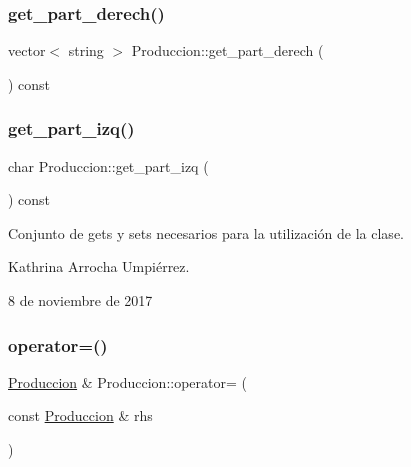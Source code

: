\mbox{\label{class_produccion_a9e1c08ed736e97288f8bf78286498f57}} 
\subsubsection{\texorpdfstring{get\+\_\+part\+\_\+derech()}{get\_part\_derech()}}
{\footnotesize\ttfamily vector$<$ string $>$ Produccion\+::get\+\_\+part\+\_\+derech (\begin{DoxyParamCaption}{ }\end{DoxyParamCaption}) const}

\mbox{\label{class_produccion_ac863aa129550b93bf54b8c6489b432fe}} 
\subsubsection{\texorpdfstring{get\+\_\+part\+\_\+izq()}{get\_part\_izq()}}
{\footnotesize\ttfamily char Produccion\+::get\+\_\+part\+\_\+izq (\begin{DoxyParamCaption}{ }\end{DoxyParamCaption}) const}

Conjunto de gets y sets necesarios para la utilización de la clase.

Kathrina Arrocha Umpiérrez.

8 de noviembre de 2017 \mbox{\label{class_produccion_a31a114a57efbe80598cdfc5b739ed3b4}} 
\subsubsection{\texorpdfstring{operator=()}{operator=()}}
{\footnotesize\ttfamily \hyperlink{class_produccion}{Produccion} \& Produccion\+::operator= (\begin{DoxyParamCaption}\item[{const \hyperlink{class_produccion}{Produccion} \&}]{rhs }\end{DoxyParamCaption})}

